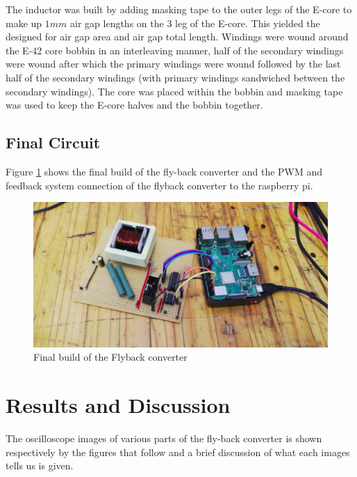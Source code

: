 \documentclass[a4paper, 12pt]{article}
\begin{document}
\noindent
The inductor was built by adding masking tape to the outer legs of the E-core to make up $1mm$ air gap lengths on the $3$ leg of the E-core. This yielded the designed for air gap area and air gap total length. Windings were wound around the  E-42 core bobbin in an interleaving manner, half of the secondary windings were wound after which the primary windings were wound followed by the last half of the secondary windings (with  primary windings sandwiched between the secondary windings). The core was placed within the bobbin and masking tape was used to keep the E-core halves and the bobbin together. 



\subsection{Final Circuit}
Figure \ref{fig:flyback_converter_build} shows the final build of the fly-back converter and the PWM and feedback system connection of the flyback converter to the raspberry pi.
\begin{figure}[H]
  \centering
  \includegraphics[width=\textwidth]{images/final_circuit_image.png}
  \caption{Final build of the Flyback converter}
  \label{fig:flyback_converter_build}
\end{figure}


\section{Results and Discussion}
The oscilloscope images of various parts of the fly-back converter is shown respectively by the figures that follow and a brief discussion of what each images tells us is given.
\end{document}

